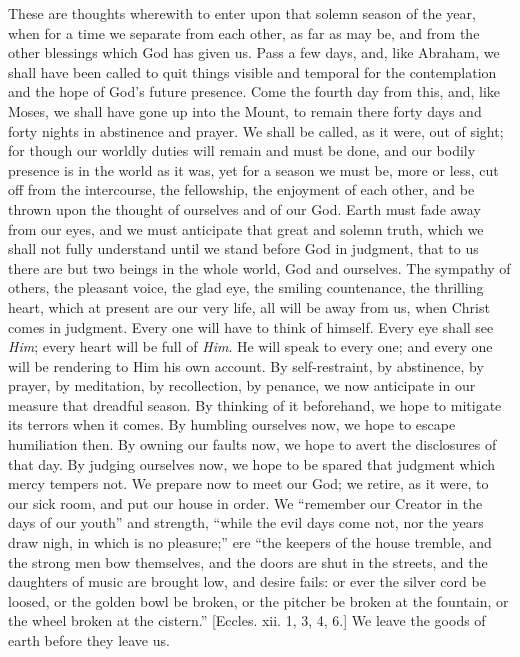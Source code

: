 These are thoughts wherewith to enter upon that solemn season of
the year, when for a time we separate from each other, as far as may
be, and from the other blessings which God has given us. Pass a few
days, and, like Abraham, we shall have been called to quit things
visible and temporal for the contemplation and the hope of God's
future presence. Come the fourth day from this,
and, like Moses, we shall have gone up into the Mount, to remain there
forty days and forty nights in abstinence and prayer. We shall be
called, as it were, out of sight; for though our worldly duties will
remain and must be done, and our bodily presence is in the world as it
was, yet for a season we must be, more or less, cut off from the
intercourse, the fellowship, the enjoyment of each other, and be
thrown upon the thought of ourselves and of our God. Earth must fade
away from our eyes, and we must anticipate that great and solemn
truth, which we shall not fully understand until we stand before God
in judgment, that to us there are but two beings in the whole world,
God and ourselves. The sympathy of others, the pleasant voice, the
glad eye, the smiling countenance, the thrilling heart, which at
present are our very life, all will be away from us, when Christ comes
in judgment. Every one will have to think of himself. Every eye shall
see \emph{Him}; every heart will be full of \emph{Him}. He will speak
to every one; and every one will be rendering to Him his own account.
By self-restraint, by abstinence, by prayer, by meditation, by
recollection, by penance, we now anticipate in our measure that
dreadful season. By thinking of it beforehand, we hope to mitigate its
terrors when it comes. By humbling ourselves now, we hope to escape
humiliation then. By owning our faults now, we hope to avert the
disclosures of that day. By judging ourselves now, we hope to be
spared that judgment which mercy tempers not. We prepare now to meet
our God; we retire, as it were, to our sick room, and put our house in
order. We ``remember our Creator in the days of our youth''
and strength, ``while the evil days come not, nor the years draw
nigh, in which is no pleasure;'' ere ``the keepers of the
house tremble, and the strong men bow themselves, and the doors are
shut in the streets, and the daughters of music are brought low, and
desire fails: or ever the silver cord be loosed, or the golden bowl be
broken, or the pitcher be broken at the fountain, or the wheel broken
at the cistern.'' [Eccles. xii. 1, 3, 4, 6.] We leave the goods of
earth before they leave us.

